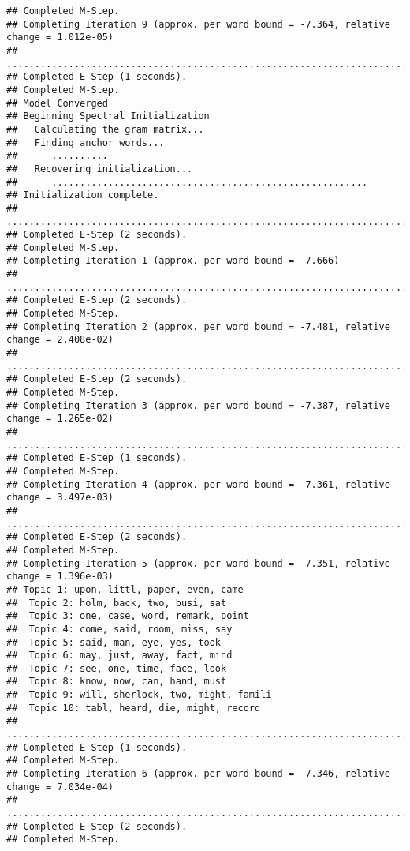 \documentclass[
]{book}
\begin{document}
\begin{verbatim}
## Completed M-Step. 
## Completing Iteration 9 (approx. per word bound = -7.364, relative change = 1.012e-05) 
## ....................................................................................................
## Completed E-Step (1 seconds). 
## Completed M-Step. 
## Model Converged 
## Beginning Spectral Initialization 
##   Calculating the gram matrix...
##   Finding anchor words...
##      ..........
##   Recovering initialization...
##      ........................................................
## Initialization complete.
## ....................................................................................................
## Completed E-Step (2 seconds). 
## Completed M-Step. 
## Completing Iteration 1 (approx. per word bound = -7.666) 
## ....................................................................................................
## Completed E-Step (2 seconds). 
## Completed M-Step. 
## Completing Iteration 2 (approx. per word bound = -7.481, relative change = 2.408e-02) 
## ....................................................................................................
## Completed E-Step (2 seconds). 
## Completed M-Step. 
## Completing Iteration 3 (approx. per word bound = -7.387, relative change = 1.265e-02) 
## ....................................................................................................
## Completed E-Step (1 seconds). 
## Completed M-Step. 
## Completing Iteration 4 (approx. per word bound = -7.361, relative change = 3.497e-03) 
## ....................................................................................................
## Completed E-Step (2 seconds). 
## Completed M-Step. 
## Completing Iteration 5 (approx. per word bound = -7.351, relative change = 1.396e-03) 
## Topic 1: upon, littl, paper, even, came 
##  Topic 2: holm, back, two, busi, sat 
##  Topic 3: one, case, word, remark, point 
##  Topic 4: come, said, room, miss, say 
##  Topic 5: said, man, eye, yes, took 
##  Topic 6: may, just, away, fact, mind 
##  Topic 7: see, one, time, face, look 
##  Topic 8: know, now, can, hand, must 
##  Topic 9: will, sherlock, two, might, famili 
##  Topic 10: tabl, heard, die, might, record 
## ....................................................................................................
## Completed E-Step (1 seconds). 
## Completed M-Step. 
## Completing Iteration 6 (approx. per word bound = -7.346, relative change = 7.034e-04) 
## ....................................................................................................
## Completed E-Step (2 seconds). 
## Completed M-Step. 

\end{verbatim}
\end{document}
